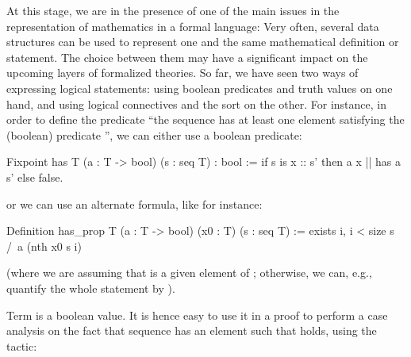 \label{ch:boolrefl}





At this stage, we are in the presence of one of the main issues in the
representation of mathematics in a formal language: Very often,
several data structures can be used to represent one and the same
mathematical definition or statement. The choice between them
may have a significant impact
on the upcoming layers of formalized theories. So far, we have seen two
ways of expressing logical statements: using boolean predicates and
truth values on one hand, and using logical connectives and the
 sort on the other. For instance, in order to define the
predicate ``the sequence  has at least one element satisfying the
(boolean) predicate '', we can either use a boolean predicate:

\begin{coq}{}{}
Fixpoint has T (a : T -> bool) (s : seq T) : bool :=
  if s is x :: s' then a x || has a s' else false.
\end{coq}

or we can use an alternate formula, like for instance:

\begin{coq}{}{}
Definition has_prop  T (a : T -> bool) (x0 : T) (s : seq T) :=
   exists i, i < size s /\ a (nth x0 s i)
\end{coq}

(where we are assuming that  is a given element of ;
otherwise, we can, e.g., quantify the whole statement by
).

Term  is a boolean value.  It is hence
easy to use it in a proof to perform a case
analysis on the fact that sequence
 has an element such that  holds, using the  tactic:

